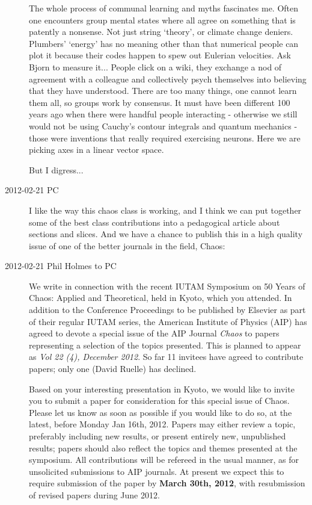 \begin{description}
\medskip

The whole process of communal learning and myths fascinates me. Often one
encounters group mental states where all agree on something that is
patently a nonsense. Not just string `theory', or climate change deniers.
Plumbers' `energy' has no meaning other than that numerical people can
plot it because their codes happen to spew out Eulerian velocities. Ask
Bjorn to measure it... People click on a wiki, they exchange a nod of
agreement with a colleague and collectively psych themselves into
believing that they have understood. There are too many things, one
cannot learn them all, so groups work by consensus. It must have been
different 100 years ago when there were handful people interacting -
otherwise we still would not be using Cauchy's contour integrals and
quantum mechanics - those were inventions that really required exercising
neurons. Here we are picking axes in a linear vector space.

\medskip

But I digress...


\item[2012-02-21 PC]  I like the way this chaos class is working, and I
think we can put together some of the best class contributions into a
pedagogical article about sections and slices. And we have a chance to
publish this in a high quality issue of one of the better journals in the
field, Chaos:

\item[2012-02-21 Phil Holmes to PC]
We write in connection with the recent IUTAM Symposium on 50 Years of
Chaos: Applied and Theoretical, held in Kyoto, which you attended. In
addition to the Conference Proceedings to be published by Elsevier as
part of their regular IUTAM series, the American Institute of Physics
(AIP) has agreed to devote a special issue of the AIP Journal
\emph{Chaos} to papers representing a selection of the topics presented.
This is planned to appear as \emph{Vol 22 (4), December 2012}. So far 11
invitees have agreed to contribute papers; only one (David Ruelle) has
declined.


Based on your interesting presentation in Kyoto, we would like to invite
you to submit a paper for consideration for this special issue of Chaos.
Please let us know as soon as possible if you would like to do so, at the
latest, before Monday Jan 16th, 2012. Papers may either review a topic,
preferably including new results, or present entirely new, unpublished
results; papers should also reflect the topics and themes presented at
the symposium. All contributions will be refereed in the usual manner, as
for unsolicited submissions to AIP journals. At present we expect this to
require submission of the paper by \textbf{March 30th, 2012}, with
resubmission of revised papers during June 2012.



\end{description}
